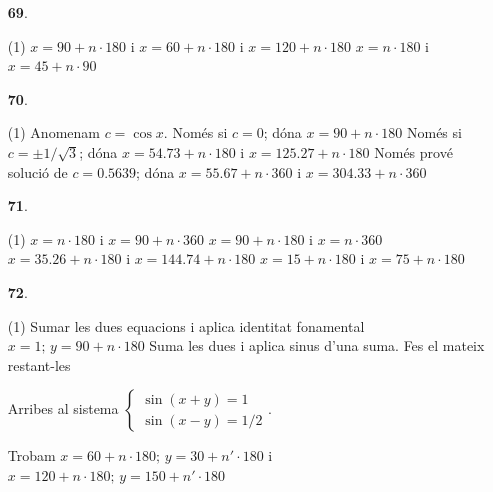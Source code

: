 \documentclass[a4paper, pdf, twoside]{book}
\begin{document}
\begin{multicols}{2}
\begin{enumerate}

 \item[\fontfamily{phv}\selectfont\color{blue}\textbf{69}. ] 
 \begin{tasks}[column-sep=1em, item-indent=1.3333em](1)
	 \task* $x=90+n\cdot 180$ i $x=60+n\cdot 180$ i $x=120+n\cdot 180$
	 \task* $x=n \cdot 180$ i $x=45+n\cdot 90$
\end{tasks}
\vspace{0.25cm}



 \item[\fontfamily{phv}\selectfont\color{blue}\textbf{70}. ] 
 \begin{tasks}[column-sep=1em, item-indent=1.3333em](1)
	 \task* Anomenam $c=\cos x$. Només si $c=0$; dóna $x=90+n\cdot 180$
	 \task* Només si $c=\pm 1/\sqrt {3}$; dóna $x=54.73+n\cdot 180$ i $x=125.27+n\cdot 180$
	 \task* Només prové solució de $c=0.5639$; dóna $x=55.67+n\cdot 360$ i $x=304.33+n\cdot 360$
\end{tasks}
\vspace{0.25cm}



 \item[\fontfamily{phv}\selectfont\color{blue}\textbf{71}. ] 
 \begin{tasks}[column-sep=1em, item-indent=1.3333em](1)
	 \task* $x=n\cdot 180$ i $x=90+n\cdot 360$
	 \task* $x=90+n\cdot 180$ i $x=n\cdot 360$
	 \task* $x=35.26+n\cdot 180$ i $x=144.74+n\cdot 180$
	 \task* $x=15+n\cdot 180$ i $x=75+n\cdot 180$
\end{tasks}
\vspace{0.25cm}



 \item[\fontfamily{phv}\selectfont\color{blue}\textbf{72}. ] 
 \begin{tasks}[column-sep=1em, item-indent=1.3333em](1)
	 \task* Sumar les dues equacions i aplica identitat fonamental $x=1;\,y=90+n\cdot 180$
	 \task* Suma les dues i aplica sinus d'una suma. Fes el mateix restant-les\par Arribes al sistema $\left \{\begin {array}{l} \sin (x+y)=1 \\ \sin (x-y)=1/2 \end {array} \right .$.\par Trobam $x=60+n\cdot 180;\,y=30+n'\cdot 180$ i $x=120+n\cdot 180;\,y=150+n'\cdot 180$ 
\end{tasks}
\vspace{0.25cm}



\end{enumerate}
\end{multicols}
\end{document}
